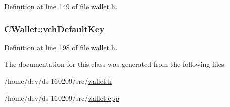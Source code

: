 Definition at line 149 of file wallet.\+h.

\hypertarget{class_c_wallet_a6d415899e530a91e6e28dd0fa4ecef8d}{}
\subsubsection[{vch\+Default\+Key}]{ C\+Wallet\+::vch\+Default\+Key}\label{class_c_wallet_a6d415899e530a91e6e28dd0fa4ecef8d}


Definition at line 198 of file wallet.\+h.



The documentation for this class was generated from the following files\+:\begin{DoxyCompactItemize}
\item 
/home/dev/ds-\/160209/src/\hyperlink{wallet_8h}{wallet.\+h}\item 
/home/dev/ds-\/160209/src/\hyperlink{wallet_8cpp}{wallet.\+cpp}\end{DoxyCompactItemize}
